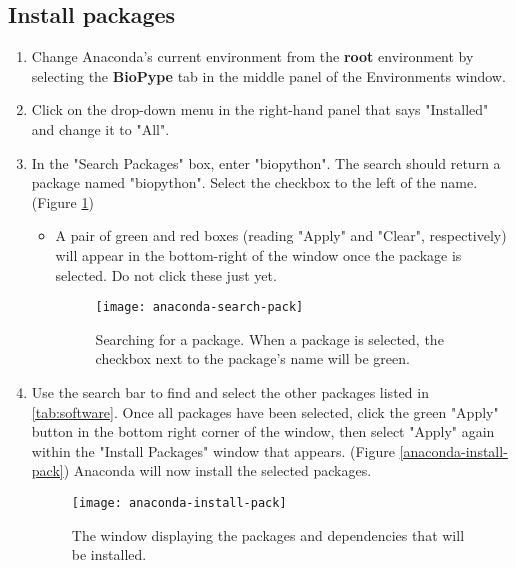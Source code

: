 \subsection{Install packages}
    \begin{enumerate}
        \item Change Anaconda's current environment from the \textbf{root} environment by selecting the \textbf{BioPype} tab in the middle panel of the Environments window.
        \item Click on the drop-down menu in the right-hand panel that says "Installed" and change it to "All".
        \item In the "Search Packages" box, enter "biopython". The search should return a package named "biopython". Select the checkbox to the left of the name. (Figure \ref{anaconda-search-pack})
        \begin{itemize}
            \item A pair of green and red boxes (reading "Apply" and "Clear", respectively) will appear in the bottom-right of the window once the package is selected. Do not click these just yet. 
    \begin{figure}[hbtp]
        \begin{center}
        \texttt{[image: anaconda-search-pack]}
        \caption{Searching for a package. When a package is selected, the checkbox next to the package's name will be green.}
        \label{anaconda-search-pack}
        \end{center}
    \end{figure}
        \end{itemize}
        \item Use the search bar to find and select the other packages listed in \autoref{tab:software}. Once all packages have been selected, click the green "Apply" button in the bottom right corner of the window, then select "Apply" again within the "Install Packages" window that appears. (Figure \ref{anaconda-install-pack}) Anaconda will now install the selected packages.
    \begin{figure}[hbtp]
        \begin{center}
        \texttt{[image: anaconda-install-pack]}
        \caption{The window displaying the packages and dependencies that will be installed.}

\end{center}
\end{figure}
\end{enumerate}
